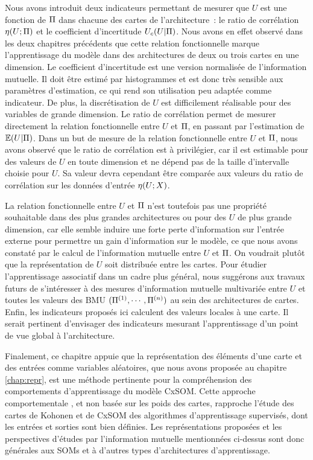\documentclass[../main]{subfiles}
\begin{document}
Nous avons introduit deux indicateurs permettant de mesurer que $U$ est une fonction de $\Pi$ dans chacune des cartes de l'architecture~: le ratio de corrélation $\eta(U;\Pi)$ et le coefficient d'incertitude $U_c(U|\Pi)$.
Nous avons en effet observé dans les deux chapitres précédents que cette relation fonctionnelle marque l'apprentissage du modèle dans des architectures de deux ou trois cartes en une dimension.
Le coefficient d'incertitude est une version normalisée de l'information mutuelle. Il doit être estimé par histogrammes et est donc très sensible aux paramètres d'estimation, ce qui rend son utilisation peu adaptée comme indicateur. De plus, la discrétisation de $U$ est difficilement réalisable pour des variables de grande dimension.
Le ratio de corrélation permet de mesurer directement la relation fonctionnelle entre $U$ et $\Pi$, en passant par l'estimation de $\mathbb{E}(U|\Pi)$.
Dans un but de mesure de la relation fonctionnelle entre $U$ et $\Pi$, nous avons observé que le ratio de corrélation est à privilégier, car il est estimable pour des valeurs de $U$ en toute dimension et ne dépend pas de la taille d'intervalle choisie pour $U$. Sa valeur devra cependant être comparée aux valeurs du ratio de corrélation sur les données d'entrée $\eta(U;X)$.

La relation fonctionnelle entre $U$ et $\Pi$ n'est toutefois pas une propriété souhaitable dans des plus grandes architectures ou pour des $U$ de plus grande dimension, car elle semble induire une forte perte d'information sur l'entrée externe pour permettre un gain d'information sur le modèle, ce que nous avons constaté par le calcul de l'information mutuelle entre $U$ et $\Pi$.
On voudrait plutôt que la représentation de $U$ soit distribuée entre les cartes.
Pour étudier l'apprentissage associatif dans un cadre plus général, nous suggérons aux travaux futurs de s'intéresser à des mesures d'information mutuelle multivariée entre $U$ et toutes les valeurs des BMU $(\Pi^{({1})}, \cdots, \Pi^{({n})})$ au sein des architectures de cartes.
Enfin, les indicateurs proposés ici calculent des valeurs locales à une carte. Il serait pertinent d'envisager des indicateurs mesurant l'apprentissage d'un point de vue global à l'architecture.

Finalement, ce chapitre appuie que la représentation des éléments d'une carte et des entrées comme variables aléatoires, que nous avons proposée au chapitre \ref{chap:repr}, est une méthode pertinente pour la compréhension des comportements d'apprentissage du modèle CxSOM.
Cette approche \og comportementale \fg{}, et non basée sur les poids des cartes, rapproche l'étude des cartes de Kohonen et de CxSOM des algorithmes d'apprentissage supervisés, dont les entrées et sorties sont bien définies.
Les représentations proposées et les perspectives d'études par l'information mutuelle mentionnées ci-dessus sont donc générales aux SOMs et à d'autres types d'architectures d'apprentissage.

\ifSubfilesClassLoaded{
    \printbibliography
}{}
\end{document}
